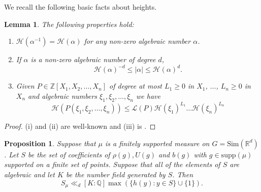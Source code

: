 \documentclass[10pt, english,oneside,reqno]{amsart}
\theoremstyle{plain}
\newtheorem{proposition}[theorem]{Proposition}
\newtheorem{lemma}[theorem]{Lemma}
\theoremstyle{remark}
\numberwithin{equation}{section}
\numberwithin{figure}{section}
\newcommand{\Z}{\mathbb{Z}}
\newcommand{\R}{\mathbb{R}}
\begin{document}
We recall the following basic facts about heights.

\begin{lemma} \label{lemma:height_basic}
The following properties hold:
\begin{enumerate}[label = (\roman*)]
    \item $\mathcal{H}(\alpha^{-1}) = \mathcal{H}(\alpha)$ for any non-zero algebraic number $\alpha$.
    \item If $\alpha$ is a non-zero algebraic number of degree $d$, $$\mathcal{H}(\alpha)^{-d} \leq |\alpha| \leq \mathcal{H}(\alpha)^d.$$
    \item Given $P \in \Z[X_1, X_2, \dots, X_n]$ of degree at most $L_1 \geq 0$ in $X_1$, $\dots$, $L_n \geq 0$ in $X_n$ and algebraic numbers $\xi_1, \xi_2, \dots, \xi_n$ we have
\begin{equation*}
\mathcal{H}(P(\xi_1, \xi_2, \dots, \xi_n)) \leq \mathcal{L}(P) \mathcal{H}(\xi_1)^{L_1} \dots \mathcal{H}(\xi_n)^{L_n}
\end{equation*}
\end{enumerate}
\end{lemma}
\begin{proof}
(i) and (ii) are well-known and (iii) is \cite[Proposition 14.7]{MasserPolynomialsBook}.
\end{proof}


\begin{proposition} \label{HeightSeparationBound}
    Suppose that $\mu$ is a finitely supported measure on $G = \mathrm{Sim}(\R^d)$. Let $S$ be the set of coefficients of $\rho(g), U(g)$ and $b(g)$ with $g \in \mathrm{supp}(\mu)$ supported on a finite set of points. Suppose that all of the elements of $S$ are algebraic and let $K$ be the number field generated by $S$. Then $$S_{\mu} \ll_d [K:\mathbb{Q}] \max (\{h(y) : y \in S \} \cup \{1 \} ).$$
\end{proposition}
\end{document}
